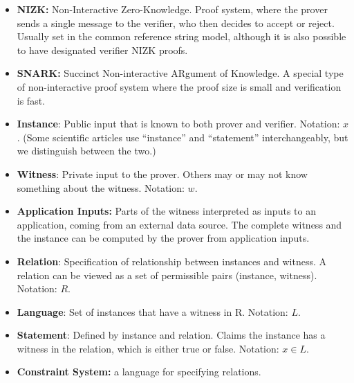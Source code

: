 \begin{itemize}[leftmargin=1em]
 
\item \textbf{NIZK:} 
Non-Interactive Zero-Knowledge. Proof system, where the prover sends a single message to the verifier, who then decides to accept or reject. Usually set in the common reference string model, although it is also possible to have designated verifier NIZK proofs.
 
\item \textbf{SNARK:} 
Succinct Non-interactive ARgument of Knowledge. A special type of non-interactive proof system where the proof size is small and verification is fast.
 


    \item \textbf{Instance}: Public input that is known to both prover and verifier. Notation: $x$.
		(Some scientific articles use ``instance'' and ``statement'' interchangeably, but we distinguish between the two.)
    
		\item \textbf{Witness}: Private input to the prover. Others may or may not know something about the witness. Notation: $w$.
    \item \textbf{Application Inputs:} Parts of the witness interpreted as inputs to an application, coming from an external data source. The complete witness and the instance can be computed by the prover from application inputs.
    \item \textbf{Relation}: Specification of relationship between instances and witness. A relation can be viewed as a set of permissible pairs (instance, witness). Notation: $R$.
    \item \textbf{Language}: Set of instances that have a witness in R. Notation: $L$.
    \item \textbf{Statement}: Defined by instance and relation. Claims the instance has a witness in the relation, which is either true or false. Notation: $x \in L$.
    \item \textbf{Constraint System:} a language for specifying relations.



\end{itemize}
